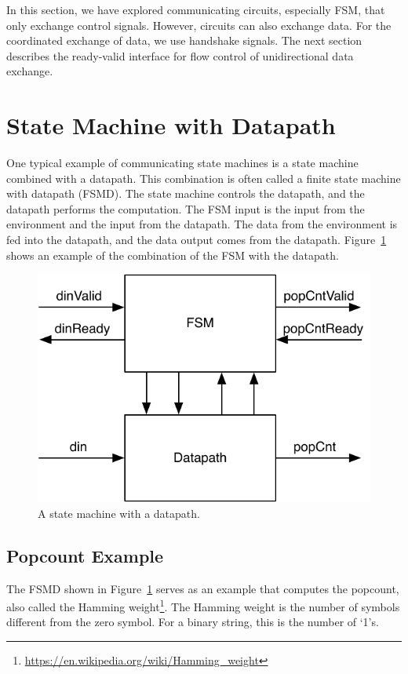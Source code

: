 \documentclass[%
    10pt,
    headinclude, footexclude,
    openright, %
    notitlepage,
    cleardoubleempty,
    headsepline,
    pointlessnumbers,
    bibtotoc, idxtotoc,
    ]{scrbook}
\newcommand{\scale}{0.7}
\newcommand{\myref}[2]{\href{#1}{#2}}
\renewcommand{\myref}[2]{{#2}{\footnote{\url{#1}}}}
\begin{document}
In this section, we have explored communicating circuits, especially FSM, that
only exchange control signals. However, circuits can also exchange data.
For the coordinated exchange of data, we use handshake signals.
The next section describes the ready-valid interface for flow control of
unidirectional data exchange.

\section{State Machine with Datapath}

One typical example of communicating state machines is a state machine
combined with a datapath. This combination is often called a finite state machine
with datapath (FSMD). The state machine controls the datapath, and the datapath
performs the computation. The FSM input is the input from the environment and the input
from the datapath. The data from the environment is fed into the datapath, and the
data output comes from the datapath. Figure~\ref{fig:popcnt-fsmd} shows an example
of the combination of the FSM with the datapath.

\begin{figure}
  \centering
  \includegraphics[scale=\scale]{figures/popcnt-fsmd}
  \caption{A state machine with a datapath.}
  \label{fig:popcnt-fsmd}
\end{figure}

\subsection{Popcount Example}

The FSMD shown in Figure~\ref{fig:popcnt-fsmd} serves as an example that computes the
popcount, also called the \myref{https://en.wikipedia.org/wiki/Hamming_weight}{Hamming weight}.
The Hamming weight is the number of symbols different from the zero symbol.
For a binary string, this is the number of `1's.
\end{document}

